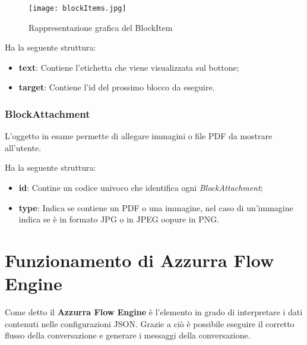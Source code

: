 \begin{figure}[h]
	\centering
	\texttt{[image: blockItems.jpg]}
	\caption{Rappresentazione grafica del BlockItem}
\end{figure}
Ha la seguente struttura:

\begin{itemize}
	\item \textbf{text}: Contiene l'etichetta che viene visualizzata sul bottone;
	\item \textbf{target}: Contiene l'id del prossimo blocco da eseguire.
\end{itemize}



\subsubsection*{BlockAttachment} 
L'oggetto in esame permette di allegare immagini o file PDF da mostrare all'utente.

Ha la seguente struttura:

\begin{itemize}
	\item \textbf{id}: Contine un codice univoco che identifica ogni \textsl{BlockAttachment};
	\item \textbf{type}: Indica se contiene un PDF o una immagine, nel caso di un'immagine indica se è in formato JPG o in JPEG oopure in PNG.
\end{itemize}	

\section{Funzionamento di Azzurra Flow Engine}
Come detto il \textbf{Azzurra Flow Engine} è l'elemento in grado di interpretare i dati contenuti nelle configurazioni JSON. Grazie a ciò è possibile eseguire il corretto flusso della conversazione e generare i messaggi della conversazione. 
